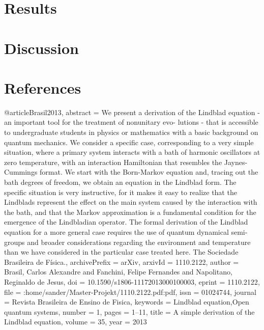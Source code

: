 \documentclass[12pt,a4paper]{article}
\begin{document}
\section{Results}



\section{Discussion}

\section{References}
@article{Brasil2013,
abstract = {We present a derivation of the Lindblad equation - an important tool for the treatment of nonunitary evo- lutions - that is accessible to undergraduate students in physics or mathematics with a basic background on quantum mechanics. We consider a specific case, corresponding to a very simple situation, where a primary system interacts with a bath of harmonic oscillators at zero temperature, with an interaction Hamiltonian that resembles the Jaynes-Cummings format. We start with the Born-Markov equation and, tracing out the bath degrees of freedom, we obtain an equation in the Lindblad form. The specific situation is very instructive, for it makes it easy to realize that the Lindblads represent the effect on the main system caused by the interaction with the bath, and that the Markov approximation is a fundamental condition for the emergence of the Lindbladian operator. The formal derivation of the Lindblad equation for a more general case requires the use of quantum dynamical semi-groups and broader considerations regarding the environment and temperature than we have considered in the particular case treated here. {\textcopyright} The Sociedade Brasileira de F{\'{i}}sica.},
archivePrefix = {arXiv},
arxivId = {1110.2122},
author = {Brasil, Carlos Alexandre and Fanchini, Felipe Fernandes and Napolitano, Reginaldo de Jesus},
doi = {10.1590/s1806-11172013000100003},
eprint = {1110.2122},
file = {:home/sander/Master-Projekt/1110.2122.pdf:pdf},
issn = {01024744},
journal = {Revista Brasileira de Ensino de Fisica},
keywords = {Lindblad equation,Open quantum systems},
number = {1},
pages = {1--11},
title = {{A simple derivation of the Lindblad equation}},
volume = {35},
year = {2013}
}
\end{document}
